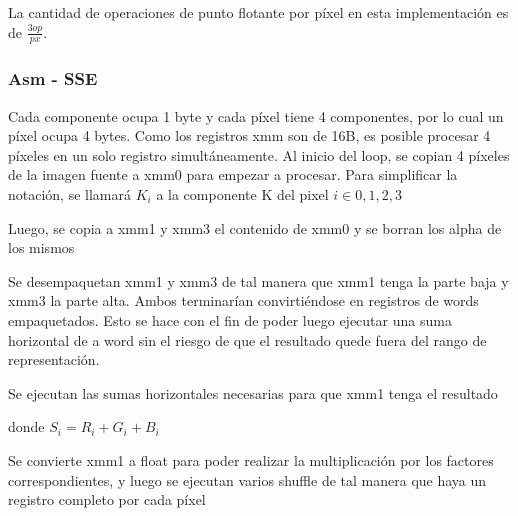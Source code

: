 La cantidad de operaciones de punto flotante por píxel en esta implementación es de $\frac{3op}{px}$.

\subsubsection{Asm - SSE}

Cada componente ocupa 1 byte y cada píxel tiene 4 componentes, por lo cual un píxel ocupa 4 bytes. Como los registros xmm son de 16B, es posible procesar 4 píxeles en un solo registro simultáneamente.
Al inicio del loop, se copian 4 píxeles de la imagen fuente a xmm0 para empezar a procesar. Para simplificar la notación, se llamará $K_{i}$ a la componente K del pixel $i \in {0,1,2,3}$

 

Luego, se copia a xmm1 y xmm3 el contenido de xmm0 y se borran los alpha de los mismos

 

 

Se desempaquetan xmm1 y xmm3 de tal manera que xmm1 tenga la parte baja y xmm3 la parte alta. Ambos terminarían convirtiéndose en registros de words empaquetados. Esto se hace con el fin de poder luego ejecutar una suma horizontal de a word sin el riesgo de que el resultado quede fuera del rango de representación.

 

 

Se ejecutan las sumas horizontales necesarias para que xmm1 tenga el resultado

 

donde $S_{i} = R_{i} + G_{i} + B_{i}$

Se convierte xmm1 a float para poder realizar la multiplicación por los factores correspondientes, y luego se ejecutan varios shuffle de tal manera que haya un registro completo por cada píxel

